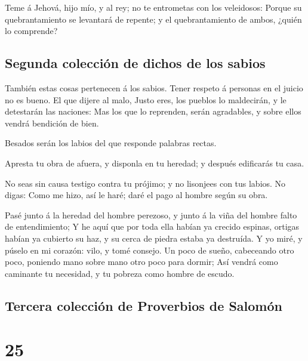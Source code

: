  Teme á Jehová, hijo mío, y al rey; no te entrometas con
los veleidosos:  Porque su quebrantamiento se levantará
de repente; y el quebrantamiento de ambos, ¿quién lo comprende?

\hypertarget{segunda-colecciuxf3n-de-dichos-de-los-sabios}{%
\subsection{Segunda colección de dichos de los
sabios}\label{segunda-colecciuxf3n-de-dichos-de-los-sabios}}

 También estas cosas pertenecen á los sabios. Tener
respeto á personas en el juicio no es bueno.  El que
dijere al malo, Justo eres, los pueblos lo maldecirán, y le detestarán
las naciones:  Mas los que lo reprenden, serán
agradables, y sobre ellos vendrá bendición de bien.

 Besados serán los labios del que responde palabras
rectas.

 Apresta tu obra de afuera, y disponla en tu heredad; y
después edificarás tu casa.

 No seas sin causa testigo contra tu prójimo; y no
lisonjees con tus labios.  No digas: Como me hizo, así le
haré; daré el pago al hombre según su obra.

 Pasé junto á la heredad del hombre perezoso, y junto á
la viña del hombre falto de entendimiento;  Y he aquí que
por toda ella habían ya crecido espinas, ortigas habían ya cubierto su
haz, y su cerca de piedra estaba ya destruída.  Y yo
miré, y púselo en mi corazón: vilo, y tomé consejo.  Un
poco de sueño, cabeceando otro poco, poniendo mano sobre mano otro poco
para dormir;  Así vendrá como caminante tu necesidad, y
tu pobreza como hombre de escudo.

\hypertarget{tercera-colecciuxf3n-de-proverbios-de-salomuxf3n}{%
\subsection{Tercera colección de Proverbios de
Salomón}\label{tercera-colecciuxf3n-de-proverbios-de-salomuxf3n}}

\hypertarget{section-24}{%
\section{25}\label{section-24}}

